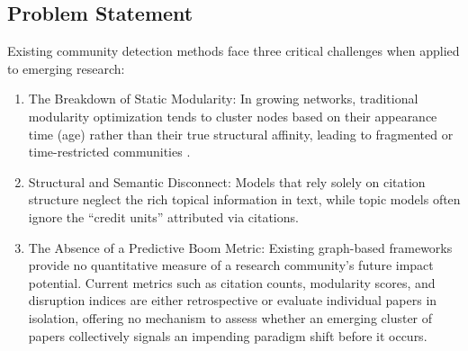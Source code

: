\documentclass[a4paper,12pt]{article}
\begin{document}
\subsection{Problem Statement}
Existing community detection methods face three critical challenges when applied to emerging 
research:
\vspace{-25pt}
\begin{enumerate}
    \item The Breakdown of Static Modularity: In growing networks, traditional modularity 
    optimization tends to cluster nodes based on their appearance time (age) rather than their 
    true structural affinity, leading to fragmented or time-restricted communities
    \parencite{medo_optimal_2019}.
    \vspace{-10pt}
    \item Structural and Semantic Disconnect: Models that rely solely on citation structure 
    neglect the rich topical information in text, while topic models often ignore the 
    “credit units” attributed via citations\parencite{huang_topic-sensitive_2018}.
    \vspace{-10pt}
    \item The Absence of a Predictive Boom Metric: Existing graph-based frameworks provide no 
    quantitative measure of a research community's future impact potential. Current metrics 
    such as citation counts, modularity scores, and disruption indices are either 
    retrospective or evaluate individual papers in isolation\parencites{ke_defining_2015}{patel_characterizing_2022}, offering no mechanism to assess whether an emerging 
    cluster of papers collectively signals an impending paradigm shift before it occurs.
\end{enumerate}
\end{document}
